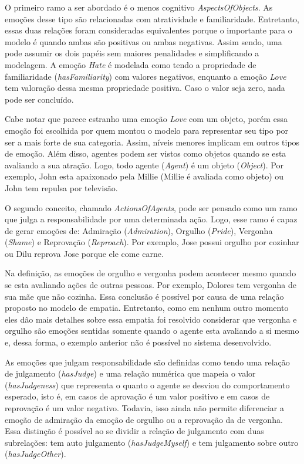 O primeiro ramo a ser abordado é o menos cognitivo \emph{AspectsOfObjects}.
As emoções desse tipo são relacionadas com atratividade e familiaridade.
Entretanto, essas duas relações foram consideradas equivalentes porque o
importante para o modelo é quando ambas são positivas ou ambas negativas.
Assim sendo, uma pode assumir os dois papéis sem maiores penalidades e
simplificando a modelagem. A emoção \emph{Hate} é modelada como tendo a
propriedade de familiaridade (\emph{hasFamiliarity}) com valores negativos,
enquanto a emoção \emph{Love} tem valoração dessa mesma propriedade positiva.
Caso o valor seja zero, nada pode ser concluído.

Cabe notar que parece estranho uma emoção \emph{Love} com um objeto, porém
essa emoção foi escolhida por quem montou o modelo para representar seu tipo
por ser a mais forte de sua categoria. Assim, níveis menores implicam em
outros tipos de emoção. Além disso, agentes
podem ser vistos como objetos quando se esta avaliando a sua atração. Logo,
todo agente (\emph{Agent}) é um objeto (\emph{Object}). Por exemplo, John esta
apaixonado pela Millie (Millie é avaliada como objeto) ou John tem
repulsa por televisão.

O segundo conceito, chamado \emph{ActionsOfAgents}, pode ser pensado como
um ramo que julga a responsabilidade por uma determinada ação.
Logo, esse ramo é capaz de gerar emoções de: Admiração (\emph{Admiration}),
Orgulho (\emph{Pride}), Vergonha (\emph{Shame}) e Reprovação
(\emph{Reproach}). Por exemplo, Jose possui orgulho por cozinhar ou Dilu
reprova Jose porque ele come carne.

Na definição, as emoções de orgulho e vergonha podem acontecer mesmo quando se
esta avaliando ações de outras pessoas. Por exemplo, Dolores tem vergonha de
sua mãe que não cozinha. Essa conclusão é possível por causa de uma relação
proposto no modelo \occ de empatia\label{mark:empat}. Entretanto, como em nenhum outro momento eles
dão mais detalhes sobre essa empatia foi resolvido considerar que vergonha e
orgulho são emoções sentidas somente quando o agente esta avaliando a si mesmo
e, dessa forma, o exemplo anterior não é possível no sistema desenvolvido. \dev{}

As emoções que julgam responsabilidade são definidas como tendo uma relação de
julgamento (\emph{hasJudge}) e uma relação numérica que mapeia o valor
(\emph{hasJudgeness}) que representa o quanto o agente se desviou do
comportamento esperado, isto é, em casos de aprovação é um valor positivo e em
casos de reprovação é um valor negativo. Todavia, isso ainda não permite
diferenciar a emoção de admiração da emoção de orgulho ou a reprovação da de
vergonha. Essa distinção é possível ao se dividir a relação de julgamento com
duas subrelações: tem auto julgamento (\emph{hasJudgeMyself}) e tem
julgamento sobre outro (\emph{hasJudgeOther}).

